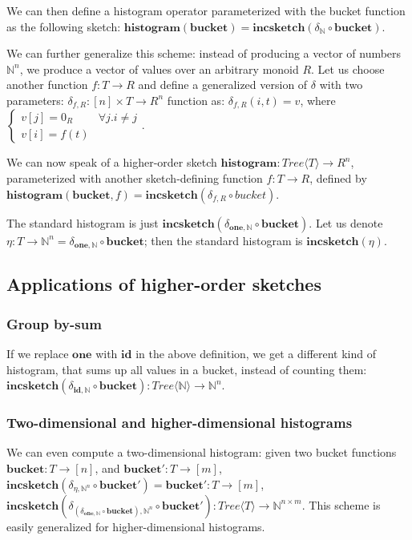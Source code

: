 \documentclass{article}
\newcommand{\tree}[1]{\mathit{Tree}\langle #1 \rangle}
\newcommand{\mr}[1]{\ensuremath{\mathrm{\mathbf{#1}}}}
\newcommand{\N}{\ensuremath{\mathbb{N}}\xspace}
\begin{document}
We can then define a histogram operator parameterized with the bucket
function as the following sketch: $\mr{histogram}(\mr{bucket}) =
\mr{incsketch}(\delta_{\N} \circ \mr{bucket})$.

We can further generalize this scheme: instead of producing a vector
of numbers $\N^n$, we produce a vector of values over an arbitrary
monoid $R$.  Let us choose another function $f: T \rightarrow R$ and
define a generalized version of $\delta$ with two parameters:
$\delta_{f,R}: [n] \times T \rightarrow R^n$ function as:
$\delta_{f,R}(i, t) = v$, where $
\begin{cases}
  v[j] = 0_R & \forall j.i \not= j \\
  v[i] = f(t)
\end{cases}
$.

We can now speak of a higher-order sketch $\mr{histogram}: \tree{T}
\rightarrow R^n$, parameterized with another sketch-defining function
$f: T \rightarrow R$, defined by $\mr{histogram}(\mr{bucket}, f) =
\mr{incsketch}(\delta_{f,R} \circ bucket)$.

The standard histogram is just $\mr{incsketch}(\delta_{\mr{one}, \N}
\circ \mr{bucket})$.  Let us denote $\eta: T \rightarrow \N^n =
\delta_{\mr{one}, \N} \circ \mr{bucket}$; then the standard histogram
is $\mr{incsketch}(\eta)$.

\subsection{Applications of higher-order sketches}

\subsubsection{Group by-sum}

If we replace $\mr{one}$ with $\mr{id}$ in the above definition, we
get a different kind of histogram, that sums up all values in a
bucket, instead of counting them: $\mr{incsketch}(\delta_{\mr{id}, \N}
\circ \mr{bucket}): \tree{\N} \rightarrow \N^n$.

\subsubsection{Two-dimensional and higher-dimensional histograms}

We can even compute a two-dimensional histogram: given two bucket
functions $\mr{bucket}: T \rightarrow [n]$, and $\mr{bucket}': T
\rightarrow [m]$, $\mr{incsketch}(\delta_{\eta, \N^n} \circ
\mr{bucket}') = \mr{bucket}': T \rightarrow [m]$,
$\mr{incsketch}(\delta_{(\delta_{\mr{one}, \N} \circ \mr{bucket}),
  \N^n} \circ \mr{bucket}'): \tree{T} \rightarrow \N^{n \times m}$.
This scheme is easily generalized for higher-dimensional histograms.
\end{document}
